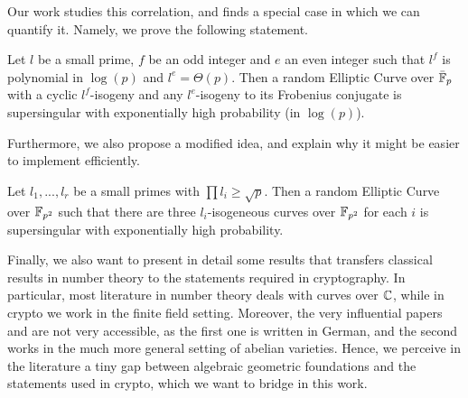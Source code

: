 Our work studies this correlation, and finds a special case in which we can quantify it.
Namely, we prove the following statement.
\begin{prop}
    Let $l$ be a small prime, $f$ be an odd integer and $e$ an even integer such that $l^f$ is polynomial in $\log(p)$ and $l^e = \Theta(p)$.
    Then a random Elliptic Curve over $\bar{\mathbb{F}}_p$ with a cyclic $l^f$-isogeny and any $l^e$-isogeny to its Frobenius conjugate is supersingular with exponentially high probability (in $\log(p)$).
\end{prop}
Furthermore, we also propose a modified idea, and explain why it might be easier to implement efficiently.
\begin{prop}
    Let $l_1, ..., l_r$ be a small primes with $\prod l_i \geq \sqrt{p}$.
    Then a random Elliptic Curve over $\mathbb{F}_{p^2}$ such that there are three $l_i$-isogeneous curves over $\mathbb{F}_{p^2}$ for each $i$ is supersingular with exponentially high probability.
\end{prop}
Finally, we also want to present in detail some results that transfers classical results in number theory to the statements required in cryptography.
In particular, most literature in number theory deals with curves over $\mathbb{C}$, while in crypto we work in the finite field setting.
Moreover, the very influential papers \cite{deuring_endomorphism_rings} and \cite{class_group_action_waterhouse} are not very accessible, as the first one is written in German, and the second works in the much more general setting of abelian varieties.
Hence, we perceive in the literature a tiny gap between algebraic geometric foundations and the statements used in crypto, which we want to bridge in this work.